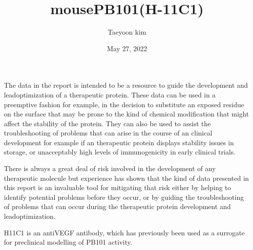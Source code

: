 \documentclass[letterpaper,10pt,english]{jupyterBook}
\title{mousePB101(H-11C1)}
\date{May 27, 2022}
\author{Taeyoon kim}
\begin{document}
\pagestyle{empty}
\sphinxmaketitle
\pagestyle{plain}
\sphinxtableofcontents
\pagestyle{normal}
\label{\detokenize{intro::doc}}


\begin{DUlineblock}{0em}
\item[] 
\end{DUlineblock}

\sphinxAtStartPar
The data in the report is intended to be a resource to guide the development and lead\sphinxhyphen{}optimization of a therapeutic protein. These data can be used in a preemptive fashion \sphinxhyphen{} for example, in the decision to substitute an exposed residue on the surface that may be prone to the kind of chemical modification that might affect the stability of the protein. They can also be used to assist the troubleshooting of problems that can arise in the course of an clinical development \sphinxhyphen{} for example if an therapeutic protein displays stability issues in storage, or unacceptably high levels of immunogenicity in early clinical trials.

\sphinxAtStartPar
There is always a great deal of risk involved in the development of any therapeutic molecule but experience has shown that the kind of data presented in this report is an invaluable tool for mitigating that risk \sphinxhyphen{} either by helping to identify potential problems before they occur, or by guiding the troubleshooting of problems that can occur during the therapeutic protein development and lead\sphinxhyphen{}optimization.

\begin{DUlineblock}{0em}
\item[] 
\end{DUlineblock}

\sphinxAtStartPar
H\sphinxhyphen{}11C1 is an anti\sphinxhyphen{}VEGF antibody, which has previously been used as a surrogate for preclinical modelling of PB101 activity.

\begin{DUlineblock}{0em}
\item[] 
\end{DUlineblock}

\begin{sphinxVerbatim}[commandchars=\\\{\}]
 
\end{sphinxVerbatim}
\end{document}

